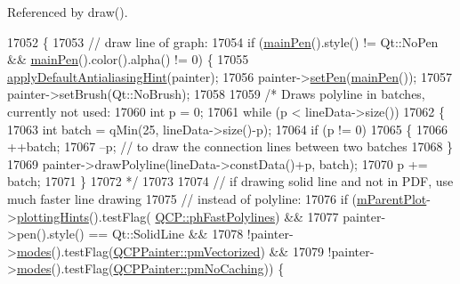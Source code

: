 Referenced by draw().


\begin{DoxyCode}
17052                                                               \{
17053   \textcolor{comment}{// draw line of graph:}
17054   \textcolor{keywordflow}{if} (\hyperlink{class_q_c_p_abstract_plottable_a19276ed2382a3a06464417b8788b1451}{mainPen}().style() != Qt::NoPen && \hyperlink{class_q_c_p_abstract_plottable_a19276ed2382a3a06464417b8788b1451}{mainPen}().color().alpha() != 0) \{
17055     \hyperlink{class_q_c_p_abstract_plottable_a76e9d6cc7972dc1528f526d163766aca}{applyDefaultAntialiasingHint}(painter);
17056     painter->\hyperlink{class_q_c_p_painter_af9c7a4cd1791403901f8c5b82a150195}{setPen}(\hyperlink{class_q_c_p_abstract_plottable_a19276ed2382a3a06464417b8788b1451}{mainPen}());
17057     painter->setBrush(Qt::NoBrush);
17058 
17059     \textcolor{comment}{/* Draws polyline in batches, currently not used:}
17060 \textcolor{comment}{    int p = 0;}
17061 \textcolor{comment}{    while (p < lineData->size())}
17062 \textcolor{comment}{    \{}
17063 \textcolor{comment}{      int batch = qMin(25, lineData->size()-p);}
17064 \textcolor{comment}{      if (p != 0)}
17065 \textcolor{comment}{      \{}
17066 \textcolor{comment}{        ++batch;}
17067 \textcolor{comment}{        --p; // to draw the connection lines between two batches}
17068 \textcolor{comment}{      \}}
17069 \textcolor{comment}{      painter->drawPolyline(lineData->constData()+p, batch);}
17070 \textcolor{comment}{      p += batch;}
17071 \textcolor{comment}{    \}}
17072 \textcolor{comment}{    */}
17073 
17074     \textcolor{comment}{// if drawing solid line and not in PDF, use much faster line drawing}
17075     \textcolor{comment}{// instead of polyline:}
17076     \textcolor{keywordflow}{if} (\hyperlink{class_q_c_p_layerable_aa2a528433e44db02b8aef23c1f9f90ed}{mParentPlot}->\hyperlink{class_q_custom_plot_a130b55e205697a5288081e9fc11e443e}{plottingHints}().testFlag(
      \hyperlink{namespace_q_c_p_a5400e5fcb9528d92002ddb938c1f4ef4aa5fd227bc878c56ad2a87ea32c74ee4d}{QCP::phFastPolylines}) &&
17077         painter->pen().style() == Qt::SolidLine &&
17078         !painter->\hyperlink{class_q_c_p_painter_a99b89eaf5363faaa1e1e6162856f436c}{modes}().testFlag(\hyperlink{class_q_c_p_painter_a156cf16444ff5e0d81a73c615fdb156daeda679cd55dcd468341d07d48a30b6ab}{QCPPainter::pmVectorized}) &&
17079         !painter->\hyperlink{class_q_c_p_painter_a99b89eaf5363faaa1e1e6162856f436c}{modes}().testFlag(\hyperlink{class_q_c_p_painter_a156cf16444ff5e0d81a73c615fdb156dae78f9a4eb277a5f9207f50850a51a0b0}{QCPPainter::pmNoCaching})) \{

\end{DoxyCode}
